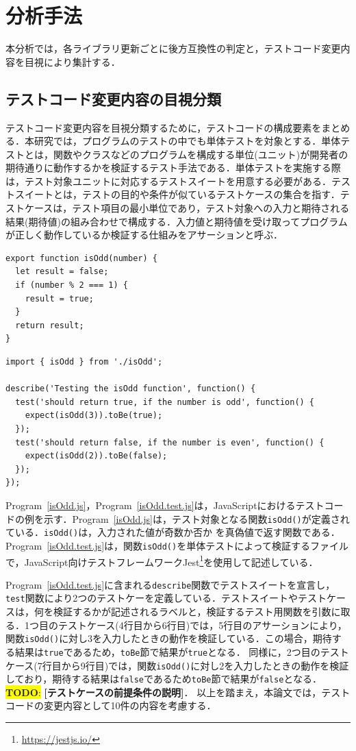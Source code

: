 \documentclass[11pt,dvipdfmx]{jreport}
\newcommand{\todo}[1]{\colorbox{yellow}{{\bf TODO}:}{\color{red} {\textbf{[#1]}}}}
\begin{document}
\section{分析手法}
本分析では，各ライブラリ更新ごとに後方互換性の判定と，テストコード変更内容を目視により集計する．

\subsection{テストコード変更内容の目視分類}
テストコード変更内容を目視分類するために，テストコードの構成要素をまとめる．本研究では，プログラムのテストの中でも単体テストを対象とする．単体テストとは，関数やクラスなどのプログラムを構成する単位(ユニット)が開発者の期待通りに動作するかを検証するテスト手法である．単体テストを実施する際は，テスト対象ユニットに対応するテストスイートを用意する必要がある．テストスイートとは，テストの目的や条件が似ているテストケースの集合を指す．テストケースは，テスト項目の最小単位であり，テスト対象への入力と期待される結果(期待値)の組み合わせで構成する．入力値と期待値を受け取ってプログラムが正しく動作しているか検証する仕組みをアサーションと呼ぶ．

\begin{lstlisting}[caption=isOdd.js, label=isOdd.js]
export function isOdd(number) {
  let result = false;
  if (number % 2 === 1) {
    result = true;
  }
  return result;
}
\end{lstlisting}

\begin{lstlisting}[caption=isOdd.test.js, label=isOdd.test.js]
import { isOdd } from './isOdd';

describe('Testing the isOdd function', function() {
  test('should return true, if the number is odd', function() {
    expect(isOdd(3)).toBe(true);
  });
  test('should return false, if the number is even', function() {
    expect(isOdd(2)).toBe(false);
  });
});
\end{lstlisting}

Program~\ref{isOdd.js}，Program~\ref{isOdd.test.js}は，JavaScriptにおけるテストコードの例を示す．Program~\ref{isOdd.js}は，テスト対象となる関数{\verb|isOdd()|}が定義されている．{\verb|isOdd()|}は，入力された値が奇数か否か
を真偽値で返す関数である．Program~\ref{isOdd.test.js}は，関数{\verb|isOdd()|}を単体テストによって検証するファイルで，JavaScript向けテストフレームワークJest\footnote{\url{https://jestjs.io/}}を使用して記述している．

Program~\ref{isOdd.test.js}に含まれる{\verb|describe|}関数でテストスイートを宣言し，{\verb|test|}関数により2つのテストケーを定義している．テストスイートやテストケースは，何を検証するかが記述されるラベルと，検証するテスト用関数を引数に取る．1つ目のテストケース(4行目から6行目)では，5行目のアサーションにより，関数{\verb|isOdd()|}に対し3を入力したときの動作を検証している．この場合，期待する結果は{\verb|true|}であるため，{\verb|toBe|}節で結果が{\verb|true|}となる．
同様に，2つ目のテストケース(7行目から9行目)では，関数{\verb|isOdd()|}に対し2を入力したときの動作を検証しており，期待する結果は{\verb|false|}であるため{\verb|toBe|}節で結果が{\verb|false|}となる．\todo{テストケースの前提条件の説明}．
以上を踏まえ，本論文では，テストコードの変更内容として10件の内容を考慮する．
\end{document}
